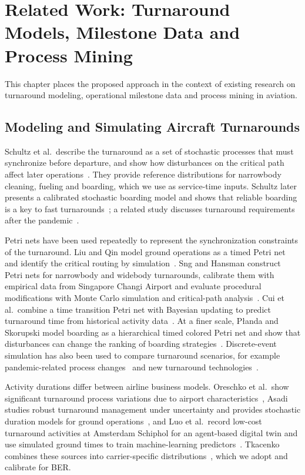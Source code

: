 \chapter{Related Work: Turnaround Models, Milestone Data and Process Mining}
\label{ch:related}

This chapter places the proposed approach in the context of existing research on turnaround modeling, operational milestone data and process mining in aviation.

\section{Modeling and Simulating Aircraft Turnarounds}

Schultz et al.\ describe the turnaround as a set of stochastic processes that must synchronize before departure, and show how disturbances on the critical path affect later operations~\cite{schultz2012dynamic}. They provide reference distributions for narrowbody cleaning, fueling and boarding, which we use as service-time inputs. Schultz later presents a calibrated stochastic boarding model and shows that reliable boarding is a key to fast turnarounds~\cite{schultz2018boarding}; a related study discusses turnaround requirements after the pandemic~\cite{schultz2020postpandemic}.

Petri nets have been used repeatedly to represent the synchronization constraints of the turnaround. Liu and Qin model ground operations as a timed Petri net and identify the critical routing by simulation~\cite{liu2006timedpetri}. Sng and Hansman construct Petri nets for narrowbody and widebody turnarounds, calibrate them with empirical data from Singapore Changi Airport and evaluate procedural modifications with Monte Carlo simulation and critical-path analysis~\cite{sng2019petri}. Cui et al.\ combine a time transition Petri net with Bayesian updating to predict turnaround time from historical activity data~\cite{cui2024ttpn}. At a finer scale, P{\l}anda and Skorupski model boarding as a hierarchical timed colored Petri net and show that disturbances can change the ranking of boarding strategies~\cite{planda2025boarding}. Discrete-event simulation has also been used to compare turnaround scenarios, for example pandemic-related process changes~\cite{tang2024covid} and new turnaround technologies~\cite{purohit2026intact}.

Activity durations differ between airline business models. Oreschko et al.\ show significant turnaround process variations due to airport characteristics~\cite{oreschko2010variations}, Asadi studies robust turnaround management under uncertainty and provides stochastic duration models for ground operations~\cite{asadi2024robust}, and Luo et al.\ record low-cost turnaround activities at Amsterdam Schiphol for an agent-based digital twin and use simulated ground times to train machine-learning predictors~\cite{luo2024digitaltwin,luo2021agent}. Tkacenko combines these sources into carrier-specific distributions~\cite{tkacenko2026}, which we adopt and calibrate for BER.

